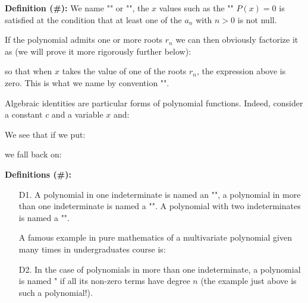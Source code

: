 	\textbf{Definition (\#\mydef):} We name "" or "", the $x$ values such as the "" $P(x)=0$ is satisfied at the condition that at least one of the $a_n$ with $n>0$ is not null.
	
	If the polynomial admits one or more roots $r_n$ we can then obviously factorize it as (we will prove it more rigorously further below):
	
	so that when $x$ takes the value of one of the roots $r_n$, the expression above is zero. This is what we name by convention "".
	
	Algebraic identities are particular forms of polynomial functions. Indeed, consider a constant $c$ and a variable $x$ and:
	
	We see that if we put:
	
	we fall back on:
	
	\textbf{Definitions (\#\mydef):}
	\begin{enumerate}
		\item[D1.] A polynomial in one indeterminate is named an "", a polynomial in more than one indeterminate is named a "". A polynomial with two indeterminates is named a "".
		
		A famous example in pure mathematics of a multivariate polynomial given many times in undergraduates course is: 
		
	
		\item[D2.] In the case of polynomials in more than one indeterminate, a polynomial is named  " if all its non-zero terms have degree $n$ (the example just above is such a polynomial!).
	\end{enumerate}
	
	\pagebreak
